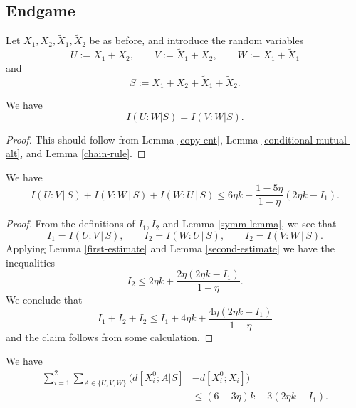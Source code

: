 \subsection{Endgame}

Let $X_1,X_2,\tilde X_1,\tilde X_2$ be as before, and introduce the random variables
\[ U := X_1 + X_2, \qquad V := \tilde X_1 + X_2, \qquad W := X_1 + \tilde X_1\] and
\[   S := X_1 + X_2 + \tilde X_1 + \tilde X_2.\]

\begin{lemma}\label{symm-lemma}
  \leanok
We have
$$ I(U:W | S) = I(V:W | S).$$
\end{lemma}

\begin{proof}
This should follow from Lemma \ref{copy-ent}, Lemma \ref{conditional-mutual-alt}, and Lemma \ref{chain-rule}.
\end{proof}

\begin{lemma}\label{uvw-s}
\leanok
We have
$$
I(U : V \, | \, S) + I(V : W \, | \,S) + I(W : U \, | \, S) \leq 6 \eta k - \frac{1 - 5 \eta}{1-\eta} (2 \eta k - I_1).
$$
\end{lemma}

\begin{proof}
  \leanok
From the definitions of $I_1,I_2$ and Lemma \ref{symm-lemma}, we see that
\[
  I_1 = I(U : V \, | \, S), \qquad I_2 = I(W : U \, | \, S), \qquad I_2 = I(V : W \, | \,S).
\]
Applying Lemma \ref{first-estimate} and Lemma \ref{second-estimate} we have the inequalities
\[   I_2 \leq 2 \eta k + \frac{2\eta(2 \eta k - I_1)}{1-\eta} .
\]
We conclude that
$$
   I_1 + I_2 + I_2 \leq I_1+4\eta k+ \frac{4\eta(2 \eta k - I_1)}{1-\eta}
$$
and the claim follows from some calculation.
\end{proof}

\begin{lemma}\label{total-dist}\leanok
   We have
\begin{align*}
  \sum_{i=1}^2 \sum_{A\in\{U,V,W\}} \big(d[X^0_i;A|S] & - d[X^0_i;X_i]\big) \\
    &\leq (6 - 3\eta) k + 3(2 \eta k - I_1).
\end{align*}
\end{lemma}

